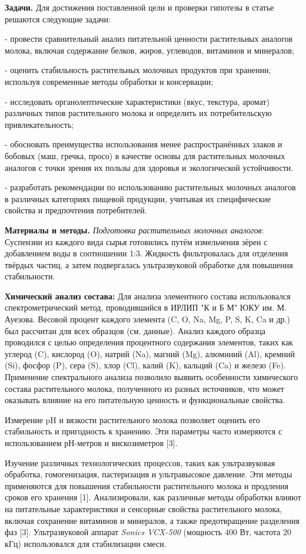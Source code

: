 {\bfseries Задачи.} Для достижения поставленной цели и проверки гипотезы в
статье решаются следующие задачи:

- провести сравнительный анализ питательной ценности растительных
аналогов молока, включая содержание белков, жиров, углеводов, витаминов
и минералов;

- оценить стабильность растительных молочных продуктов при хранении,
используя современные методы обработки и консервации;

- исследовать органолептические характеристики (вкус, текстура, аромат)
различных типов растительного молока и определить их потребительскую
привлекательность;

- обосновать преимущества использования менее распространённых злаков и
бобовых (маш, гречка, просо) в качестве основы для растительных молочных
аналогов с точки зрения их пользы для здоровья и экологической
устойчивости.

- разработать рекомендации по использованию растительных молочных
аналогов в различных категориях пищевой продукции, учитывая их
специфические свойства и предпочтения потребителей.

{\bfseries Материалы и методы.} \emph{Подготовка растительных молочных
аналогов}: Суспензии из каждого вида сырья готовились путём
измельчения зёрен с добавлением воды в соотношении 1:3. Жидкость
фильтровалась для отделения твёрдых частиц, а затем подвергалась
ультразвуковой обработке для повышения стабильности.

{\bfseries Химический анализ состава:} Для анализа элементного состава
использовался спектрометрический метод, проводившийся в ИРЛИП "К и Б М"
ЮКУ им. М. Ауезова. Весовой процент каждого элемента (C, O, Na, Mg, P,
S, K, Ca и др.) был рассчитан для всех образцов (см. данные). Анализ
каждого образца проводился с целью определения процентного содержания
элементов, таких как углерод (C), кислород (O), натрий (Na), магний
(Mg), алюминий (Al), кремний (Si), фосфор (P), сера (S), хлор (Cl),
калий (K), кальций (Ca) и железо (Fe). Применение спектрального анализа
позволило выявить особенности химического состава растительного молока,
полученного из разных источников, что может оказывать влияние на его
питательную ценность и функциональные свойства.

Измерение pH и вязкости растительного молока позволяет оценить его
стабильность и пригодность к хранению. Эти параметры часто измеряются с
использованием рН-метров и вискозиметров {[}3{]}.

Изучение различных технологических процессов, таких как ультразвуковая
обработка, гомогенизация, пастеризация и ультравысокое давление. Эти
методы применяются для повышения стабильности растительного молока и
продления сроков его хранения {[}1{]}. Анализировали, как различные
методы обработки влияют на питательные характеристики и сенсорные
свойства растительного молока, включая сохранение витаминов и минералов,
а также предотвращение разделения фаз {[}3{]}. Ультразвуковой аппарат
\emph{Sonics VCX-500} (мощность 400 Вт, частота 20 кГц) использовался
для стабилизации смеси.

